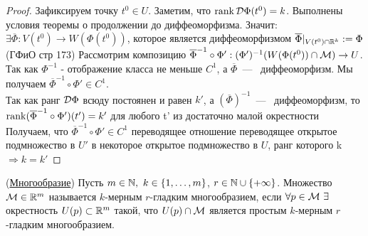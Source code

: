 \begin{proof}
    Зафиксируем точку $t^0 \in U$. Заметим, что $\operatorname{rank} \mathcal{D} \Phi (t^0) = k$. Выполнены условия теоремы о продолжении до диффеоморфизма. Значит: $\exists \overline{\Phi}: V(t^0) \to W(\Phi(t^0))$, которое является диффеоморфизмом $\overline{\Phi}|_{V(t^0) \cap \mathbb{R}^k} := \Phi$ \\

    (ГФиО стр 173) Рассмотрим композицию $\overline{\Phi}^{-1} \circ \Phi': (\Phi')^{-1} (W(\Phi(t^0)) \cap \mathcal{M}) \to U$. Так как $\Phi^{-1}$ - отображение класса не меньше $C^1$, а $\overline{\Phi}$~---~ диффеоморфизм. Мы получаем $\overline{\Phi}^{-1} \circ \Phi' \in C^1$. \\
    Так как ранг $\mathcal{D} \Phi$ всюду постоянен и равен $k'$, а $(\overline{\Phi})^{-1}$~---~ диффеоморфизм, то $\operatorname{rank}(\overline{\Phi}^{-1} \circ \Phi')(t') = k'$ для любого t' из достаточно малой окрестности \\
    Получаем, что $\overline{\Phi}^{-1} \circ \Phi' \in C^1$ переводящее отношение переводящее открытое подмножество в $U'$ в некоторое открытое подмножество в $U$, ранг которого k $\Longrightarrow k = k'$  
\end{proof}




\begin{definition} (\underline{Многообразие})
    Пусть $m \in \mathbb{N}, \ k \in \{ 1,\dots, m\}$, $r \in \mathbb{N} \cup \{+\infty \}$. Множество $\mathcal{M} \in \mathbb{R}^{m} $ называется $k$-мерным $r$-гладким многообразием, если $\forall p \in \M \ \exists$ окрестность $U(p) \subset \mathbb{R}^{m}$ такой, что $U(p) \cap \mathcal{M}$ является простым $k$-мерным $r$-гладким многообразием. 
\end{definition}

